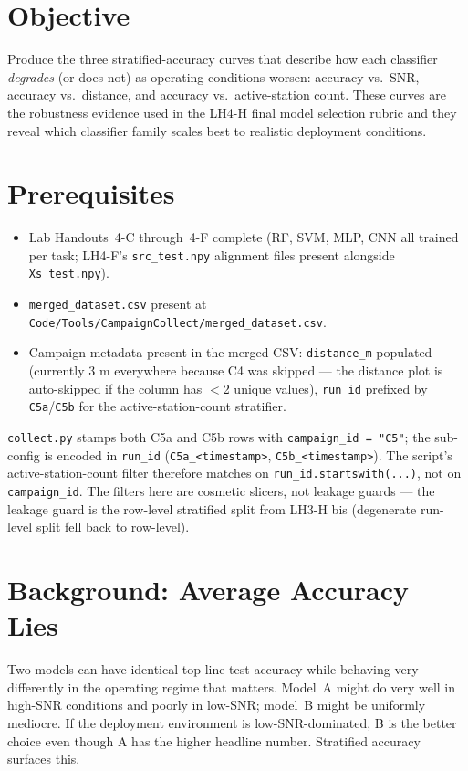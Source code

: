 \documentclass[11pt,letterpaper]{article}
\begin{document}

\section{Objective}
Produce the three stratified-accuracy curves that describe how each classifier \emph{degrades} (or does not) as operating conditions worsen: accuracy vs.\ \mbox{SNR}, accuracy vs.\ distance, and accuracy vs.\ active-station count. These curves are the robustness evidence used in the LH4-H final model selection rubric and they reveal which classifier family scales best to realistic deployment conditions.

\section{Prerequisites}
\begin{itemize}[leftmargin=2em]
	\item Lab Handouts~4-C through~4-F complete (RF, \mbox{SVM}, \mbox{MLP}, \mbox{CNN} all trained per task; LH4-F's \texttt{src\_test.npy} alignment files present alongside \texttt{Xs\_test.npy}).
	\item \texttt{merged\_dataset.csv} present at \texttt{Code/Tools/CampaignCollect/merged\_dataset.csv}.
	\item Campaign metadata present in the merged CSV: \texttt{distance\_m} populated (currently 3 m everywhere because C4 was skipped --- the distance plot is auto-skipped if the column has $<$2 unique values), \texttt{run\_id} prefixed by \texttt{C5a}/\texttt{C5b} for the active-station-count stratifier.
\end{itemize}

\begin{tcolorbox}[infobox={Sub-campaign encoding in this dataset}]
\texttt{collect.py} stamps both C5a and C5b rows with \texttt{campaign\_id = "C5"}; the sub-config is encoded in \texttt{run\_id} (\texttt{C5a\_<timestamp>}, \texttt{C5b\_<timestamp>}). The script's active-station-count filter therefore matches on \texttt{run\_id.startswith(...)}, not on \texttt{campaign\_id}. The filters here are cosmetic slicers, not leakage guards --- the leakage guard is the row-level stratified split from LH3-H bis (degenerate run-level split fell back to row-level).
\end{tcolorbox}

\section{Background: Average Accuracy Lies}
Two models can have identical top-line test accuracy while behaving very differently in the operating regime that matters. Model~A might do very well in high-\mbox{SNR} conditions and poorly in low-\mbox{SNR}; model~B might be uniformly mediocre. If the deployment environment is low-\mbox{SNR}-dominated, B is the better choice even though A has the higher headline number. Stratified accuracy surfaces this.
\end{document}
